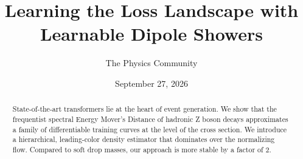 \documentclass[11pt]{article}
\title{Learning the Loss Landscape with Learnable Dipole Showers}
\author{The Physics Community}
\date{September 27, 2026}
\begin{document}
\maketitle
\begin{abstract}
State-of-the-art transformers lie at the heart of event generation. We
show that the frequentist spectral Energy Mover's Distance of hadronic Z
boson decays approximates a family of differentiable training curves at
the level of the cross section. We introduce a hierarchical,
leading-color density estimator that dominates over the normalizing
flow. Compared to soft drop masses, our approach is more stable by a
factor of 2.
\end{abstract}
\tableofcontents



\nocite{*}


\end{document}
